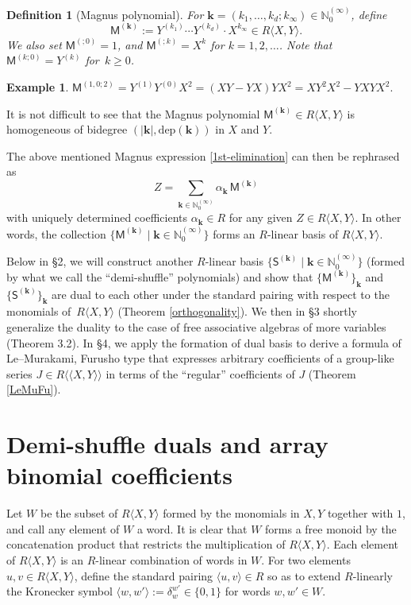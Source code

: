\documentclass[10pt]{article}
\newtheorem{Definition}[Theorem]{Definition}
\theoremstyle{definition}
\newtheorem{Example}[Theorem]{Example}
\theoremstyle{remark}
\def\bk{{\mathbf{k}}}
\def\MM{{\mathsf{M}}}
\def\SS{{\mathsf{S}}}
\def\dep{\mathrm{dep}}
\def\lp{\langle}
\def\rp{\rangle}
\def\N{{\mathbb N}}
\def\la{\langle}
\def\ra{\rangle}
\def\lala{\la\!\la}
\def\rara{\ra\!\ra}
\begin{document}
\begin{Definition}[Magnus polynomial]
\label{defMagnus}
For $\bk=(k_1,\dots,k_d; k_\infty)\in\N_0^{(\infty)}$, define
$$
\MM^{(\bk)}:=Y^{(k_1)}\cdots Y^{(k_d)} \cdot X^{k_\infty} \in R\la X,Y\ra.
$$
We also set $\MM^{(;0)}=1$, and $\MM^{(;k)}=X^k$ for $k=1,2,\dots$.
Note that $\MM^{(k;0)}=Y^{(k)}$ for~$k\ge 0$.
\end{Definition}

\begin{Example} 
$\MM^{(1,0;2)}=Y^{(1)}Y^{(0)}X^2=(XY-YX)YX^2=XY^2X^2-YXYX^2$.
\end{Example}

It is not difficult to see that the Magnus polynomial $\MM^{(\bk)}\in R\la X,Y\ra$ 
is homogeneous
of bidegree $(|\bk|,\dep(\bk))$ in $X$ and $Y$.

The above mentioned Magnus expression \eqref{1st-elimination}
can then be rephrased as
\begin{equation} \label{Magnus}
Z=\sum_{\bk\in \N_0^{(\infty)}}
\alpha_{\bk}\, \MM^{(\bk)}
\end{equation}
with uniquely determined coefficients $\alpha_{\bk}\in R$ for any given 
$Z\in R\la X,Y\ra$.
In other words, the collection $\{\MM^{(\bk)}\mid \bk\in  \N_0^{(\infty)}\}$ 
forms an $R$-linear basis of $R\la X,Y\ra$.

Below in \S 2, we will construct another $R$-linear basis 
$\{\SS^{(\bk)}\mid \bk\in  \N_0^{(\infty)}\}$
(formed by what we call the ``demi-shuffle'' polynomials)
and show that 
$\{\MM^{(\bk)}\}_\bk$
and $\{\SS^{(\bk)}\}_\bk$
are dual to each other under the standard pairing
with respect to the monomials of~$R\la X,Y\ra$
(Theorem \ref{orthogonality}).
We then in \S 3 shortly generalize the duality to the case of
free associative algebras of more variables (Theorem 
\textup{3.2}). 
In \S 4, we apply the formation of dual basis 
to derive a formula of Le--Murakami, Furusho type 
that expresses arbitrary coefficients of a group-like series 
$J\in R\lala X,Y\rara$ in terms of 
the ``regular'' coefficients of $J$
(Theorem \ref{LeMuFu}).  

\section{Demi-shuffle duals and array binomial coefficients}

Let $W$ be the subset of $R\la X,Y\ra$ formed by the monomials in $X,Y$ 
together with $1$, and call any element of $W$ a word. 
It is clear that $W$ forms a free monoid by the concatenation product
that restricts the multiplication of $R\la X,Y\ra$.
Each element of $R\la X,Y\ra$ is an $R$-linear combination of words in $W$.
For two elements $u,v\in R\la X,Y\ra$, define the standard pairing $\lp u,v\rp\in R$
so as to extend $R$-linearly the Kronecker symbol $\lp w,w'\rp:=\delta_{w}^{w'}\in\{0,1\}$
for words $w,w'\in W$.
\end{document}
